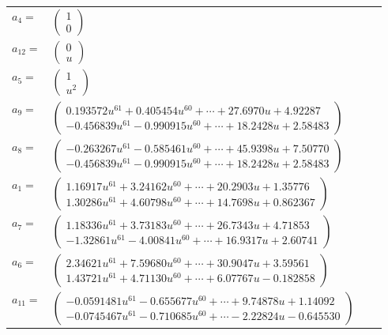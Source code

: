 \documentclass[1p]{elsarticle_modified}
\theoremstyle{definition}
\begin{document}
\begin{tabular}{m{7pt} m{180pt} m{7pt} m{180pt} }
\flushright $a_{4}=$&$\begin{pmatrix}1\\0\end{pmatrix}$ \\
\flushright $a_{12}=$&$\begin{pmatrix}0\\u\end{pmatrix}$ \\
\flushright $a_{5}=$&$\begin{pmatrix}1\\u^2\end{pmatrix}$ \\
\flushright $a_{9}=$&$\begin{pmatrix}0.193572 u^{61}+0.405454 u^{60}+\cdots+27.6970 u+4.92287\\-0.456839 u^{61}-0.990915 u^{60}+\cdots+18.2428 u+2.58483\end{pmatrix}$ \\
\flushright $a_{8}=$&$\begin{pmatrix}-0.263267 u^{61}-0.585461 u^{60}+\cdots+45.9398 u+7.50770\\-0.456839 u^{61}-0.990915 u^{60}+\cdots+18.2428 u+2.58483\end{pmatrix}$ \\
\flushright $a_{1}=$&$\begin{pmatrix}1.16917 u^{61}+3.24162 u^{60}+\cdots+20.2903 u+1.35776\\1.30286 u^{61}+4.60798 u^{60}+\cdots+14.7698 u+0.862367\end{pmatrix}$ \\
\flushright $a_{7}=$&$\begin{pmatrix}1.18336 u^{61}+3.73183 u^{60}+\cdots+26.7343 u+4.71853\\-1.32861 u^{61}-4.00841 u^{60}+\cdots+16.9317 u+2.60741\end{pmatrix}$ \\
\flushright $a_{6}=$&$\begin{pmatrix}2.34621 u^{61}+7.59680 u^{60}+\cdots+30.9047 u+3.59561\\1.43721 u^{61}+4.71130 u^{60}+\cdots+6.07767 u-0.182858\end{pmatrix}$ \\
\flushright $a_{11}=$&$\begin{pmatrix}-0.0591481 u^{61}-0.655677 u^{60}+\cdots+9.74878 u+1.14092\\-0.0745467 u^{61}-0.710685 u^{60}+\cdots-2.22824 u-0.645530\end{pmatrix}$ \\

\end{tabular}
\end{document}
